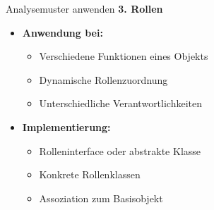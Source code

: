 \begin{KR}{Analysemuster anwenden}
\textbf{3. Rollen}
\begin{itemize}
    \item \textbf{Anwendung bei:}
    \begin{itemize}
        \item Verschiedene Funktionen eines Objekts
        \item Dynamische Rollenzuordnung
        \item Unterschiedliche Verantwortlichkeiten
    \end{itemize}
    
    \item \textbf{Implementierung:}
    \begin{itemize}
        \item Rolleninterface oder abstrakte Klasse
        \item Konkrete Rollenklassen
        \item Assoziation zum Basisobjekt
    \end{itemize}
\end{itemize}
\end{KR}

